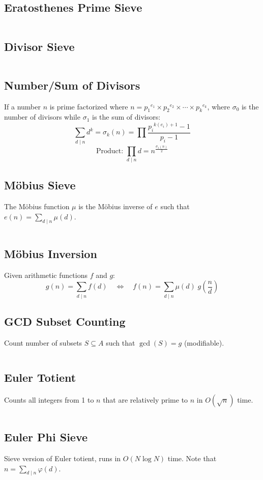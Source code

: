 \documentclass[8pt,a4paper,landscape,oneside]{amsart}
\newcommand{\code}[1]{\inputminted[fontsize=\normalsize,baselinestretch=1]{cpp}{_code/#1}}
\begin{document}
\begin{multicols*}{3}
	\subsection{Eratosthenes Prime Sieve}
    \code{numtheory/prime-sieve.cpp}
  \subsection{Divisor Sieve}
    \code{numtheory/divisor-sieve.cpp}
  \subsection{Number/Sum of Divisors}
    If a number $n$ is prime factorized where $n = {p_1}^{e_1} \times {p_2}^{e_2} \times \cdots \times {p_k}^{e_k}$, where $\sigma_0$ is the number of divisors while $\sigma_1$ is the sum of divisors:
    \[
    \sum_{d\mid n} d^k = \sigma_k (n) = \prod \frac{{p_i}^{k(e_i)+1}-1}{p_i -1}
    \]
    \[
    \text{Product: } \prod_{d\mid n} d = n^{\frac{\sigma_1 (n)}{2}}
    \]
  \subsection{M\"{o}bius Sieve}
    The M\"{o}bius function $\mu$ is the M\"{o}bius inverse of $e$ such that $e(n) = \sum_{d\mid n} \mu(d)$.
    \code{numtheory/moebius-sieve.cpp}
  \subsection{M\"{o}bius Inversion}
    Given arithmetic functions $f$ and $g$:
    \[
    g(n) = \sum_{d\mid n} f(d) \quad \Leftrightarrow \quad f(n) = \sum_{d\mid n} \mu(d)\; g\left(\frac{n}{d}\right)
    \]
  \subsection{GCD Subset Counting}
    Count number of subsets $S \subseteq A$ such that $\gcd(S) = g$ (modifiable).
    \code{numtheory/gcd-subsets.cpp}
  \subsection{Euler Totient}
    Counts all integers from 1 to $n$ that are relatively prime to $n$ in $O(\sqrt{n})$ time.
    \code{numtheory/totient.cpp}
  \subsection{Euler Phi Sieve}
    Sieve version of Euler totient, runs in $O(N \log N)$ time. Note that $n = \sum_{d\mid n} \varphi(d)$.
    \code{numtheory/phi-sieve.cpp}

\end{multicols*}
\end{document}
